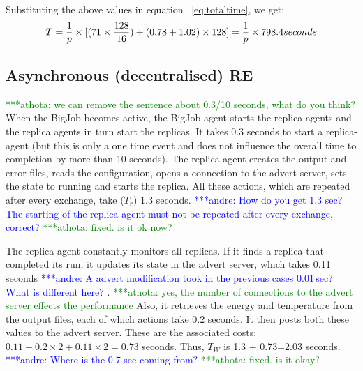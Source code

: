 \documentclass{rspublic}
\newcommand{\alnote}[1]{ {\textcolor{blue} { ***andre: #1 }}}
\newcommand{\athotanote}[1]{ {\textcolor{green} { ***athota: #1 }}}
\newcommand{\alnote}[1]{}
\newcommand{\athotanote}[1]{}
\begin{document}


Substituting the above values in equation ~\ref{eq:totaltime}, we get:
\begin{eqnarray}
T=  {1 \over p} \times {[ {(71\times {128\over 16}}) + (0.78 + 1.02)\times 128]} = {1 \over p} \times 798.4 seconds
\label{eq:cent}
\end{eqnarray}


\subsection{Asynchronous (decentralised) RE}

\athotanote{we can remove the sentence about 0.3/10 seconds, what do you think?}When the BigJob becomes active, the BigJob agent starts the replica
agents and the replica agents in turn start the replicas. It takes 0.3
seconds to start a replica-agent (but this is only a one time event and does not influence the overall time to completion by more than 10 seconds). The replica agent creates the
output and error files, reads the configuration, opens a connection to the advert server, sets the state to running and starts the
replica. All these actions, which are repeated after every exchange,
take ($T_r$) 1.3 seconds. \alnote{How do you get 1.3 sec? The starting of the replica-agent
must not be repeated after every exchange, correct?} \athotanote{fixed. is it ok now?}

The replica agent constantly monitors all replicas. If it finds
a replica that completed its run, it updates its state in the advert
server, which takes 0.11 seconds \alnote{A advert modification took in the previous
cases 0.01\,sec? What is different here?}.\athotanote{yes, the number of connections to the advert server effects the performance} Also, it retrieves the energy and
temperature from the output files, each of which actions take 0.2
seconds. It then posts both these values to the advert server. These are the associated costs: $0.11+0.2\times2+0.11\times2=0.73$ seconds.  Thus,
$T_W$ is 1.3 + 0.73=2.03 seconds.\alnote{Where is the 0.7 sec coming from?} \athotanote{fixed. is it okay?}
\end{document}
